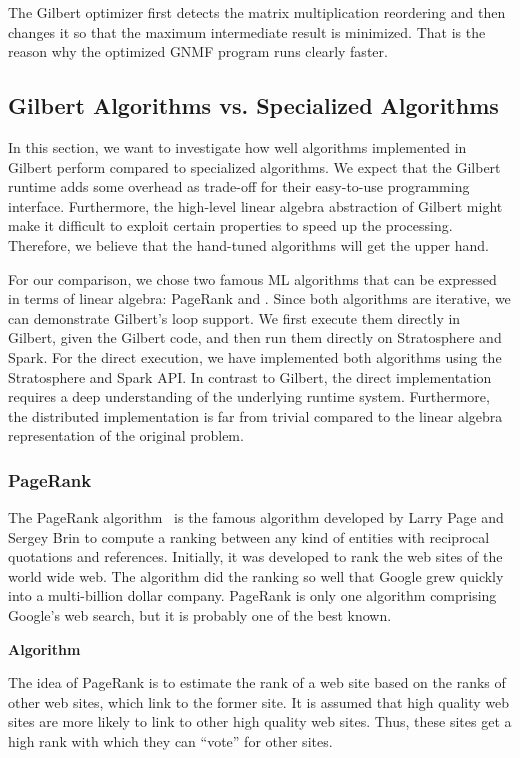 The Gilbert optimizer first detects the matrix multiplication reordering and then changes it so that the maximum intermediate result is minimized.
That is the reason why the optimized GNMF program runs clearly faster.

\subsection{Gilbert Algorithms vs. Specialized Algorithms}

In this section, we want to investigate how well algorithms implemented in Gilbert perform compared to specialized algorithms.
We expect that the Gilbert runtime adds some overhead as trade-off for their easy-to-use programming interface.
Furthermore, the high-level linear algebra abstraction of Gilbert might make it difficult to exploit certain properties to speed up the processing.
Therefore, we believe that the hand-tuned algorithms will get the upper hand.

For our comparison, we chose two famous ML algorithms that can be expressed in terms of linear algebra: PageRank and \kmeans.
Since both algorithms are iterative, we can demonstrate Gilbert's loop support.
We first execute them directly in Gilbert, given the Gilbert code, and then run them directly on Stratosphere and Spark.
For the direct execution, we have implemented both algorithms using the Stratosphere and Spark API.
In contrast to Gilbert, the direct implementation requires a deep understanding of the underlying runtime system.
Furthermore, the distributed implementation is far from trivial compared to the linear algebra representation of the original problem.

\subsubsection{PageRank}

The PageRank algorithm~\cite{page:1999a} is the famous algorithm developed by Larry Page and Sergey Brin to compute a ranking between any kind of entities with reciprocal quotations and references.
Initially, it was developed to rank the web sites of the world wide web.
The algorithm did the ranking so well that Google grew quickly into a multi-billion dollar company.
PageRank is only one algorithm comprising Google's web search, but it is probably one of the best known.

\textbf{Algorithm}

The idea of PageRank is to estimate the rank of a web site based on the ranks of other web sites, which link to the former site.
It is assumed that high quality web sites are more likely to link to other high quality web sites.
Thus, these sites get a high rank with which they can ``vote'' for other sites.

